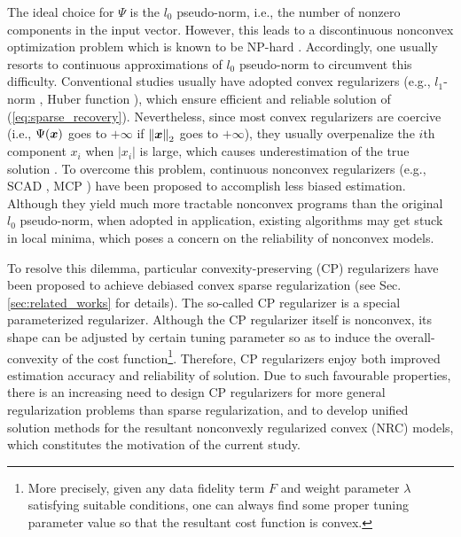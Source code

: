 \documentclass[lettersize,journal]{IEEEtran}
\theoremstyle{plain}%
\theoremstyle{definition}
\theoremstyle{remark}
\begin{document}
The ideal choice for $\Psi$ is the $l_0$ pseudo-norm, i.e., the number of nonzero components in the input vector. However, this leads to a discontinuous nonconvex optimization problem which is known to be NP-hard \cite{natarajan1995}. Accordingly, one usually resorts to continuous approximations of $l_0$ pseudo-norm to circumvent this difficulty. Conventional studies usually have adopted convex regularizers (e.g., $l_1$-norm \cite{tibshirani1996}, Huber function \cite{fessler1997}), which ensure efficient and reliable solution of (\ref{eq:sparse_recovery}). Nevertheless, since most convex regularizers are coercive (i.e., $\Psi(\bm{x})$ goes to $+\infty$ if $\left\| \bm{x} \right\|_2$ goes to $+\infty$), they usually overpenalize the $i$th component $x_i$ when $|x_i|$ is large, which causes underestimation of the true solution \cite{zhang2010}. To overcome this problem, continuous nonconvex regularizers (e.g., SCAD \cite{fan2001}, MCP \cite{zhang2010}) have been proposed to accomplish less biased estimation. Although they yield much more tractable nonconvex programs than the original $l_0$ pseudo-norm, when adopted in application, existing algorithms may get stuck in local minima, which poses a concern on the reliability of nonconvex models.

To resolve this dilemma, particular convexity-preserving (CP) regularizers have been proposed to achieve debiased convex sparse regularization (see Sec. \ref{sec:related_works} for details). The so-called CP regularizer is a special parameterized regularizer. Although the CP regularizer itself is nonconvex, its shape can be adjusted by certain tuning parameter so as to induce the overall-convexity of the cost function\footnote{More precisely, given any data fidelity term $F$ and weight parameter $\lambda$ satisfying suitable conditions, one can always find some proper tuning parameter value so that the resultant cost function is convex.}. Therefore, CP regularizers enjoy both improved estimation accuracy and reliability of solution. Due to such favourable properties, there is an increasing need to design CP regularizers for more general regularization problems than sparse regularization, and to develop unified solution methods for the resultant nonconvexly regularized convex (NRC) models, which constitutes the motivation of the current study.
\end{document}
